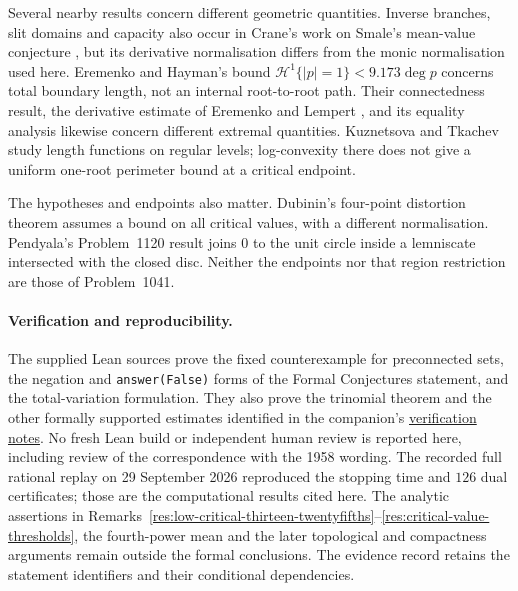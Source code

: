 \documentclass[11pt]{article}
\newcommand{\recordlink}[3]{\href{#1\##2}{#3}}
\begin{document}
Several nearby results concern different geometric quantities.
Inverse branches, slit domains and capacity also occur in Crane's work
on Smale's mean-value conjecture
\cite[Lemma~2.1 and \S\S2--4]{crane2007smale}, but its derivative
normalisation differs from the monic normalisation used here.
Eremenko and Hayman's bound
$\mathcal H^1\{|p|=1\}<9.173\deg p$
\cite[Theorem~1]{eremenko-hayman} concerns total boundary length, not
an internal root-to-root path. Their connectedness result, the
derivative estimate of Eremenko and Lempert
\cite[Theorem~1]{eremenko-lempert}, and its equality analysis
\cite[Theorem~A]{eremenko-markov} likewise concern different extremal
quantities. Kuznetsova and Tkachev
\cite[Theorems~1--2]{kuznetsova2003} study length functions on regular
levels; log-convexity there does not give a uniform one-root perimeter
bound at a critical endpoint.

The hypotheses and endpoints also matter. Dubinin's four-point distortion
theorem \cite[Theorem~1 and Corollary~4]{dubinin2013fourpoint} assumes a
bound on all critical values, with a different normalisation.
Pendyala's Problem~1120 result
\cite[Definition~1.1 and Theorem~1.2]{pendyala2026shortest} joins $0$
to the unit circle inside a lemniscate intersected with the closed disc.
Neither the endpoints nor that region restriction are those of
Problem~1041.

\paragraph{Verification and reproducibility.}
The supplied Lean sources prove the fixed counterexample for preconnected
sets, the negation and \texttt{answer(False)} forms of the Formal
Conjectures statement, and the total-variation formulation. They also
prove the trinomial theorem and the other formally supported estimates
identified in the companion's
\recordlink{erdos1041-lemniscate-reasoning-surface.pdf}{verification-notes}
{verification notes}. No fresh Lean build or independent human review
is reported here, including review of the correspondence with the 1958
wording. The recorded full rational replay on 29 September 2026
reproduced the stopping time and $126$ dual certificates; those are
the computational results cited here. The analytic assertions in Remarks~\ref{res:low-critical-thirteen-twentyfifths}--\ref{res:critical-value-thresholds},
the fourth-power mean and the later topological and compactness arguments
remain outside the formal conclusions. The evidence record retains the
statement identifiers and their conditional dependencies.
\evidenceparagraph{\evidencerecordurl}
\end{document}
